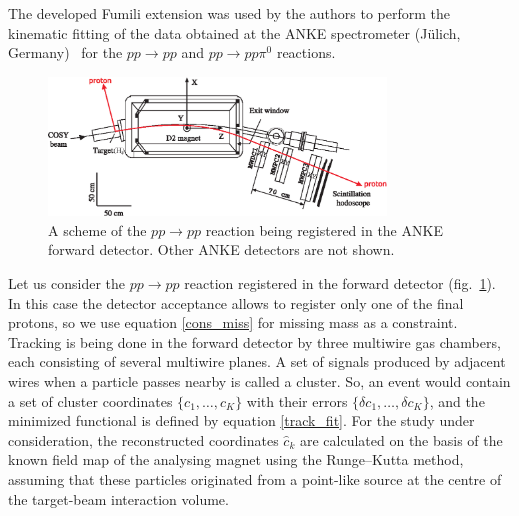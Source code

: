 The developed Fumili extension was used by the authors to perform the kinematic fitting of the data obtained at the ANKE spectrometer (Jülich, Germany)~\cite{anke} for the $pp \to pp$ and $pp \to pp\pi^0$ reactions.


\begin{figure}[htbp]\centering
\includegraphics[width=0.8\textwidth]{pics/setup_.eps}
\caption{
A scheme of the $pp \to pp$ reaction being registered in the ANKE forward detector. Other ANKE detectors are not shown.
}
\label{anke_scheme}
\end{figure}

Let us consider the $pp \to pp$ reaction registered in the forward detector (fig.~\ref{anke_scheme}).
In this case the detector acceptance allows to register only one of the final protons, so we use equation \eqref{cons_miss} for missing mass as a constraint.
Tracking is being done in the forward detector by three multiwire gas chambers, each consisting of several multiwire planes.
A set of signals produced by adjacent wires when a particle passes nearby is called a cluster.
So, an event would contain a set of cluster coordinates $\{c_1, \ldots, c_K\}$ with their errors $\{\delta c_1, \ldots, \delta c_K\}$, and the minimized functional is defined by equation \eqref{track_fit}.
For the study under consideration, the reconstructed coordinates $\hat{c}_k$ are calculated on the basis of the known field map of the analysing magnet using the Runge–Kutta method, assuming that these particles originated from a point-like source at the centre of the target-beam interaction volume.

